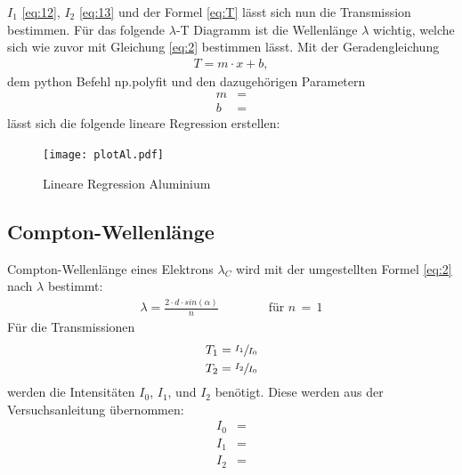     \justifying $I_1$ \eqref{eq:12}, $I_2$ \eqref{eq:13} und der Formel \eqref{eq:T} lässt sich nun die Transmission bestimmen. Für das folgende $\lambda$-T Diagramm
    ist die Wellenlänge $\lambda$ wichtig, welche sich wie zuvor mit Gleichung \eqref{eq:2} bestimmen lässt. Mit der Geradengleichung 
    \begin{align}
    T = m \cdot x + b, \label{eq:14}
    \end{align}
    dem python Befehl np.polyfit 
    \cite{numpy} und den dazugehörigen Parametern
    \begin{align}
        m &= \text{} \label{eq:15}\\
        b &= \text{} \label{eq:16}
    \end{align}
    lässt sich die folgende lineare Regression erstellen:

    \begin{figure}[H]
        \centering
        \texttt{[image: plotAl.pdf]}
        \caption{Lineare Regression Aluminium}
        \label{fig:3}
    \end{figure}

    \subsection{Compton-Wellenlänge}

    \justifying Compton-Wellenlänge eines Elektrons $\lambda_C$ wird mit der umgestellten Formel \eqref{eq:2} nach $\lambda$ bestimmt:
    \begin{align}
        \lambda = \frac{2 \cdot d \cdot sin(\alpha)}{n} \qquad \qquad \text{für $n\,=\,1$} \label{eq:17}
    \end{align} 
    Für die Transmissionen
    \begin{align}
        T_1 &= \sfrac{I_1}{I_0} \\
        T_2 &= \sfrac{I_2}{I_0} 
    \end{align}
    werden die Intensitäten $I_0$, $I_1$, und $I_2$ benötigt. Diese werden aus der Versuchsanleitung \cite{V603} übernommen:
    \begin{subequations}\label{eq:18}
    \begin{align}
        I_0 &= \text{} \label{eq:18a}\\
        I_1 &= \text{} \label{eq:18b}\\
        I_2 &= \text{} \label{eq:18c}
    \end{align}
    \end{subequations}

